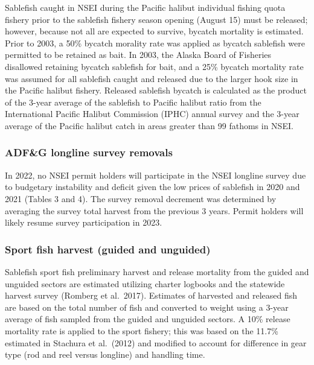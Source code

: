 \documentclass[
]{article}
\begin{document}
Sablefish caught in NSEI during the Pacific halibut individual fishing
quota fishery prior to the sablefish fishery season opening (August 15)
must be released; however, because not all are expected to survive,
bycatch mortality is estimated. Prior to 2003, a 50\% bycatch morality
rate was applied as bycatch sablefish were permitted to be retained as
bait. In 2003, the Alaska Board of Fisheries disallowed retaining
bycatch sablefish for bait, and a 25\% bycatch mortality rate was
assumed for all sablefish caught and released due to the larger hook
size in the Pacific halibut fishery. Released sablefish bycatch is
calculated as the product of the 3-year average of the sablefish to
Pacific halibut ratio from the International Pacific Halibut Commission
(IPHC) annual survey and the 3-year average of the Pacific halibut catch
in areas greater than 99 fathoms in NSEI.

\hypertarget{adfg-longline-survey-removals}{%
\subsubsection{ADF\&G longline survey
removals}\label{adfg-longline-survey-removals}}

In 2022, no NSEI permit holders will participate in the NSEI longline
survey due to budgetary instability and deficit given the low prices of
sablefish in 2020 and 2021 (Tables 3 and 4). The survey removal
decrement was determined by averaging the survey total harvest from the
previous 3 years. Permit holders will likely resume survey participation
in 2023.

\hypertarget{sport-fish-harvest-guided-and-unguided}{%
\subsubsection{Sport fish harvest (guided and
unguided)}\label{sport-fish-harvest-guided-and-unguided}}

Sablefish sport fish preliminary harvest and release mortality from the
guided and unguided sectors are estimated utilizing charter logbooks and
the statewide harvest survey (Romberg et al.~2017). Estimates of
harvested and released fish are based on the total number of fish and
converted to weight using a 3-year average of fish sampled from the
guided and unguided sectors. A 10\% release mortality rate is applied to
the sport fishery; this was based on the 11.7\% estimated in Stachura et
al.~(2012) and modified to account for difference in gear type (rod and
reel versus longline) and handling time.
\end{document}
